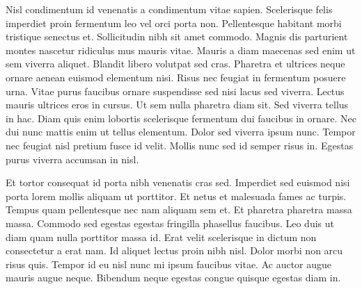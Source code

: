 \documentclass[11pt,]{article}
\begin{document}
Nisl condimentum id venenatis a condimentum vitae sapien. Scelerisque
felis imperdiet proin fermentum leo vel orci porta non. Pellentesque
habitant morbi tristique senectus et. Sollicitudin nibh sit amet
commodo. Magnis dis parturient montes nascetur ridiculus mus mauris
vitae. Mauris a diam maecenas sed enim ut sem viverra aliquet. Blandit
libero volutpat sed cras. Pharetra et ultrices neque ornare aenean
euismod elementum nisi. Risus nec feugiat in fermentum posuere urna.
Vitae purus faucibus ornare suspendisse sed nisi lacus sed viverra.
Lectus mauris ultrices eros in cursus. Ut sem nulla pharetra diam sit.
Sed viverra tellus in hac. Diam quis enim lobortis scelerisque fermentum
dui faucibus in ornare. Nec dui nunc mattis enim ut tellus elementum.
Dolor sed viverra ipsum nunc. Tempor nec feugiat nisl pretium fusce id
velit. Mollis nunc sed id semper risus in. Egestas purus viverra
accumsan in nisl.

Et tortor consequat id porta nibh venenatis cras sed. Imperdiet sed
euismod nisi porta lorem mollis aliquam ut porttitor. Et netus et
malesuada fames ac turpis. Tempus quam pellentesque nec nam aliquam sem
et. Et pharetra pharetra massa massa. Commodo sed egestas egestas
fringilla phasellus faucibus. Leo duis ut diam quam nulla porttitor
massa id. Erat velit scelerisque in dictum non consectetur a erat nam.
Id aliquet lectus proin nibh nisl. Dolor morbi non arcu risus quis.
Tempor id eu nisl nunc mi ipsum faucibus vitae. Ac auctor augue mauris
augue neque. Bibendum neque egestas congue quisque egestas diam in.
\end{document}
